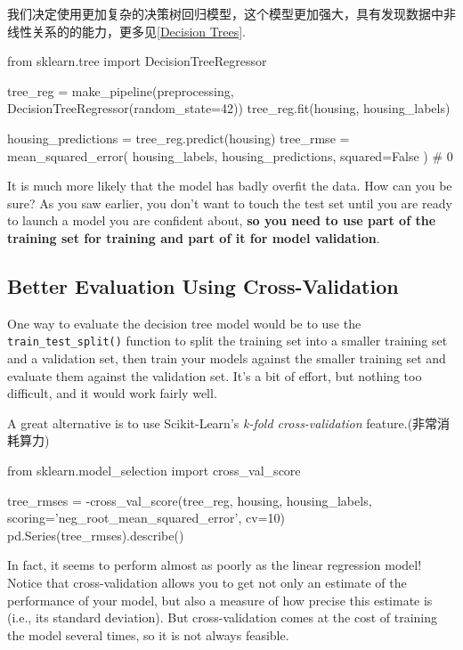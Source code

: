 我们决定使用更加复杂的决策树回归模型，这个模型更加强大，具有发现数据中非线性关系的的能力，更多见\autoref{Decision Trees}.

\begin{pyc}
from sklearn.tree import DecisionTreeRegressor

tree_reg = make_pipeline(preprocessing, DecisionTreeRegressor(random_state=42))
tree_reg.fit(housing, housing_labels)

housing_predictions = tree_reg.predict(housing)
tree_rmse = mean_squared_error(
    housing_labels,
    housing_predictions,
    squared=False
)
# 0
\end{pyc}
It is much more likely that the model has badly overfit the data. How can you be sure?
As you saw earlier, you don't want to touch the test set until you are ready to launch a
model you are confident about, \textbf{so you need to use part of the training set for training
and part of it for model validation}.

\subsection{Better Evaluation Using Cross-Validation}
One way to evaluate the decision tree model would be to use the \verb|train_test_split()| function to split the training set into a smaller training set and a validation set, then train your models against the smaller training set and evaluate
them against the validation set. It's a bit of effort, but nothing too difficult, and it
would work fairly well.

A great alternative is to use Scikit-Learn's \emph{k-fold cross-validation} feature.(非常消耗算力)
\begin{pyc}
from sklearn.model_selection import cross_val_score

tree_rmses = -cross_val_score(tree_reg, housing, housing_labels,
                              scoring='neg_root_mean_squared_error',
                              cv=10)
pd.Series(tree_rmses).describe()
\end{pyc}

In fact, it seems to perform almost as poorly as the linear regression model! Notice that cross-validation allows you to get not only an estimate of the performance of your model, but also a measure of how precise this estimate is (i.e., its standard deviation). But cross-validation comes at the cost of training the model several times, so it is not always feasible.

